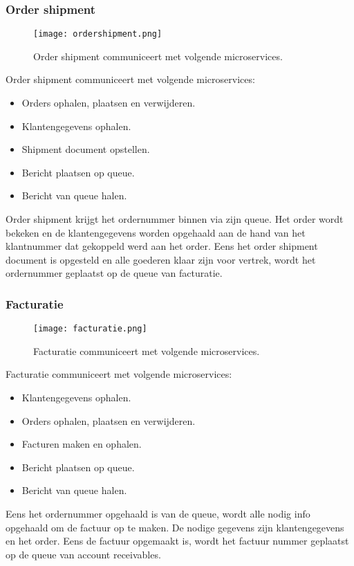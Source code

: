\subsubsection{Order shipment}
\begin{figure}[h!]
	\texttt{[image: ordershipment.png]}
	\caption{Order shipment communiceert met volgende microservices.}
	\centering
\end{figure}
Order shipment communiceert met volgende microservices:
\begin{itemize}
	\item Orders ophalen, plaatsen en verwijderen.
	\item Klantengegevens ophalen.
	\item Shipment document opstellen.
	\item Bericht plaatsen op queue.
	\item Bericht van queue halen.
\end{itemize}
Order shipment krijgt het ordernummer binnen via zijn queue. Het order wordt bekeken en de klantengegevens worden opgehaald aan de hand van het klantnummer dat gekoppeld werd aan het order. Eens het order shipment document is opgesteld en alle goederen klaar zijn voor vertrek, wordt het ordernummer geplaatst op de queue van facturatie.

\subsubsection{Facturatie}
\begin{figure}[h!]
	\texttt{[image: facturatie.png]}
	\caption{Facturatie communiceert met volgende microservices.}
	\centering
\end{figure}
Facturatie communiceert met volgende microservices:
\begin{itemize}
	\item Klantengegevens ophalen.
	\item Orders ophalen, plaatsen en verwijderen.
	\item Facturen maken en ophalen.
	\item Bericht plaatsen op queue.
	\item Bericht van queue halen.
\end{itemize}
Eens het ordernummer opgehaald is van de queue, wordt alle nodig info opgehaald om de factuur op te maken. De nodige gegevens zijn klantengegevens en het order. Eens de factuur opgemaakt is, wordt het factuur nummer geplaatst op de queue van account receivables.

